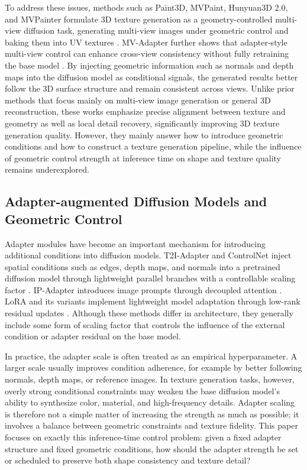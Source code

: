 \documentclass[times,twocolumn,final]{elsarticle}
\begin{document}
To address these issues, methods such as Paint3D, MVPaint, Hunyuan3D 2.0, and MVPainter formulate 3D texture generation as a geometry-controlled multi-view diffusion task, generating multi-view images under geometric control and baking them into UV textures \cite{zeng2024paint3d,cheng2024mvpaint,lai2025hunyuan3d,shao2025mvpainter}. MV-Adapter further shows that adapter-style multi-view control can enhance cross-view consistency without fully retraining the base model \cite{huang2024mvadapter}. By injecting geometric information such as normals and depth maps into the diffusion model as conditional signals, the generated results better follow the 3D surface structure and remain consistent across views. Unlike prior methods that focus mainly on multi-view image generation or general 3D reconstruction, these works emphasize precise alignment between texture and geometry as well as local detail recovery, significantly improving 3D texture generation quality. However, they mainly answer how to introduce geometric conditions and how to construct a texture generation pipeline, while the influence of geometric control strength at inference time on shape and texture quality remains underexplored.

\subsection{Adapter-augmented Diffusion Models and Geometric Control}
\label{subsec:adapter}

Adapter modules have become an important mechanism for introducing additional conditions into diffusion models. T2I-Adapter and ControlNet inject spatial conditions such as edges, depth maps, and normals into a pretrained diffusion model through lightweight parallel branches with a controllable scaling factor \cite{mou2023t2iadapter,zhang2023controlnet}. IP-Adapter introduces image prompts through decoupled attention \cite{ye2023ipadapter}. LoRA and its variants implement lightweight model adaptation through low-rank residual updates \cite{hu2022lora,liu2024dora,zhang2023adalora}. Although these methods differ in architecture, they generally include some form of scaling factor that controls the influence of the external condition or adapter residual on the base model.

In practice, the adapter scale is often treated as an empirical hyperparameter. A larger scale usually improves condition adherence, for example by better following normals, depth maps, or reference images. In texture generation tasks, however, overly strong conditional constraints may weaken the base diffusion model's ability to synthesize color, material, and high-frequency details. Adapter scaling is therefore not a simple matter of increasing the strength as much as possible; it involves a balance between geometric constraints and texture fidelity. This paper focuses on exactly this inference-time control problem: given a fixed adapter structure and fixed geometric conditions, how should the adapter strength be set or scheduled to preserve both shape consistency and texture detail?
\end{document}

